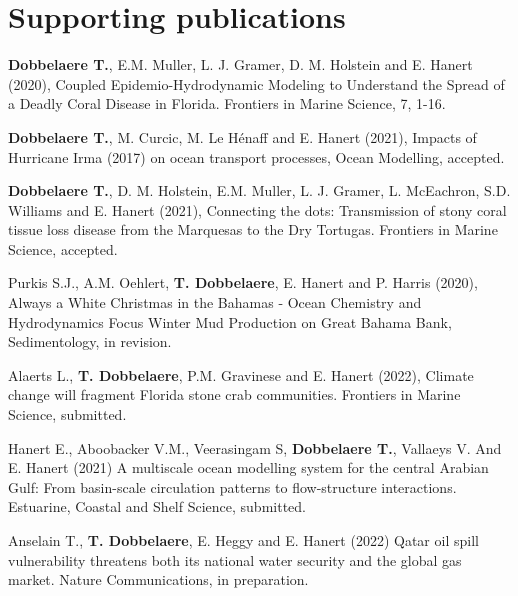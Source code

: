 \lipsum[1-12]
\clearpage

\section*{Supporting publications}


\begin{list}{}{%
\setlength{\topsep}{0pt}%
\setlength{\leftmargin}{0.23in}%
\setlength{\listparindent}{-0.23in}%
\setlength{\itemindent}{-0.23in}%
\setlength{\parsep}{\parskip}%
}%


\item \textbf{Dobbelaere T.}, E.M. Muller, L. J. Gramer, D. M. Holstein and E. Hanert (2020),  Coupled Epidemio-Hydrodynamic Modeling to Understand the Spread of a Deadly Coral Disease in Florida. Frontiers in Marine Science, 7, 1-16.

\item \textbf{Dobbelaere T.}, M. Curcic, M. Le Hénaff and E. Hanert (2021), Impacts of Hurricane Irma (2017) on ocean transport processes, Ocean Modelling, accepted.

\item \textbf{Dobbelaere T.}, D. M. Holstein, E.M. Muller, L. J. Gramer, L. McEachron, S.D. Williams and E. Hanert (2021), Connecting the dots: Transmission of stony coral tissue loss disease from the Marquesas to the Dry Tortugas. Frontiers in Marine Science, accepted.

\item Purkis S.J., A.M. Oehlert, \textbf{T. Dobbelaere}, E. Hanert and P. Harris (2020), Always a White Christmas in the Bahamas - Ocean Chemistry and Hydrodynamics Focus Winter Mud Production on Great Bahama Bank, Sedimentology, in revision.

\item Alaerts L., \textbf{T. Dobbelaere}, P.M. Gravinese and E. Hanert (2022), Climate change will fragment Florida stone crab communities. Frontiers in Marine Science, submitted.

\item Hanert E., Aboobacker V.M., Veerasingam S, \textbf{Dobbelaere T.}, Vallaeys V. And E. Hanert (2021) A multiscale ocean modelling system for the central Arabian Gulf: From basin-scale circulation patterns to flow-structure interactions. Estuarine, Coastal and Shelf Science, submitted.

\item Anselain T., \textbf{T. Dobbelaere}, E. Heggy and E. Hanert (2022) Qatar oil spill vulnerability threatens both its national water security and the global gas market. Nature Communications, in preparation.

\end{list}

